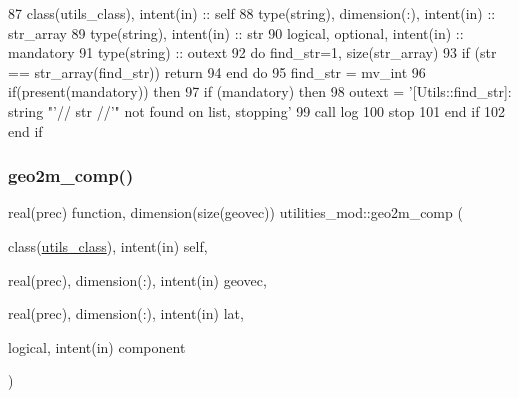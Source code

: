 \begin{DoxyCode}
87     \textcolor{keywordtype}{class}(utils\_class), \textcolor{keywordtype}{intent(in)} :: self
88     \textcolor{keywordtype}{type}(string), \textcolor{keywordtype}{dimension(:)}, \textcolor{keywordtype}{intent(in)} :: str\_array
89     \textcolor{keywordtype}{type}(string), \textcolor{keywordtype}{intent(in)} :: str
90     \textcolor{keywordtype}{logical}, \textcolor{keywordtype}{optional}, \textcolor{keywordtype}{intent(in)} :: mandatory
91     \textcolor{keywordtype}{type}(string) :: outext
92     \textcolor{keywordflow}{do} find\_str=1, \textcolor{keyword}{size}(str\_array)
93         \textcolor{keywordflow}{if} (str == str\_array(find\_str)) \textcolor{keywordflow}{return}
94 \textcolor{keywordflow}{    end do}
95     find\_str = mv\_int
96     \textcolor{keywordflow}{if}(\textcolor{keyword}{present}(mandatory)) \textcolor{keywordflow}{then}
97         \textcolor{keywordflow}{if} (mandatory) \textcolor{keywordflow}{then}
98             outext = \textcolor{stringliteral}{'[Utils::find\_str]: string "'}// str //\textcolor{stringliteral}{'" not found on list, stopping'}
99             \textcolor{keyword}{call }log%
100             stop
101 \textcolor{keywordflow}{        end if}
102 \textcolor{keywordflow}{    end if}
\end{DoxyCode}
\mbox{\label{namespaceutilities__mod_aff2244d9152396064656f20f4936a18c}} 
\subsubsection{\texorpdfstring{geo2m\+\_\+comp()}{geo2m\_comp()}}
{\footnotesize\ttfamily real(prec) function, dimension(size(geovec)) utilities\+\_\+mod\+::geo2m\+\_\+comp (\begin{DoxyParamCaption}\item[{class(\mbox{\hyperlink{structutilities__mod_1_1utils__class}{utils\+\_\+class}}), intent(in)}]{self,  }\item[{real(prec), dimension(\+:), intent(in)}]{geovec,  }\item[{real(prec), dimension(\+:), intent(in)}]{lat,  }\item[{logical, intent(in)}]{component }\end{DoxyParamCaption})\hspace{0.3cm}{\ttfamily [private]}}



